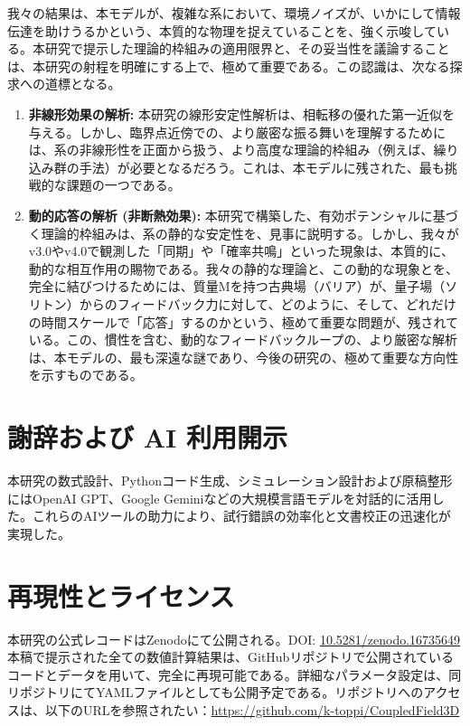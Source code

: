 \documentclass[a4paper,11pt,ja=standard,lualatex]{bxjsarticle}
\begin{document}
我々の結果は、本モデルが、複雑な系において、環境ノイズが、いかにして情報伝達を助けうるかという、本質的な物理を捉えていることを、強く示唆している。本研究で提示した理論的枠組みの適用限界と、その妥当性を議論することは、本研究の射程を明確にする上で、極めて重要である。この認識は、次なる探求への道標となる。
\begin{enumerate}
    \item \textbf{非線形効果の解析:} 本研究の線形安定性解析は、相転移の優れた第一近似を与える。しかし、臨界点近傍での、より厳密な振る舞いを理解するためには、系の非線形性を正面から扱う、より高度な理論的枠組み（例えば、繰り込み群の手法）が必要となるだろう。これは、本モデルに残された、最も挑戦的な課題の一つである。
    \item \textbf{動的応答の解析 (非断熱効果):} 本研究で構築した、有効ポテンシャルに基づく理論的枠組みは、系の静的な安定性を、見事に説明する。しかし、我々がv3.0やv4.0で観測した「同期」や「確率共鳴」といった現象は、本質的に、動的な相互作用の賜物である。我々の静的な理論と、この動的な現象とを、完全に結びつけるためには、質量Mを持つ古典場（バリア）が、量子場（ソリトン）からのフィードバック力に対して、どのように、そして、どれだけの時間スケールで「応答」するのかという、極めて重要な問題が、残されている。この、慣性を含む、動的なフィードバックループの、より厳密な解析は、本モデルの、最も深遠な謎であり、今後の研究の、極めて重要な方向性を示すものである。
\end{enumerate}

\section*{謝辞および AI 利用開示}
本研究の数式設計、Pythonコード生成、シミュレーション設計および原稿整形にはOpenAI GPT、Google Geminiなどの大規模言語モデルを対話的に活用した。これらのAIツールの助力により、試行錯誤の効率化と文書校正の迅速化が実現した。

\section*{再現性とライセンス}
本研究の公式レコードはZenodoにて公開される。DOI: \href{https://doi.org/10.5281/zenodo.16735649}{10.5281/zenodo.16735649}
本稿で提示された全ての数値計算結果は、GitHubリポジトリで公開されているコードとデータを用いて、完全に再現可能である。詳細なパラメータ設定は、同リポジトリにてYAMLファイルとしても公開予定である。リポジトリへのアクセスは、以下のURLを参照されたい：\url{https://github.com/k-toppi/CoupledField3D}
\end{document}

